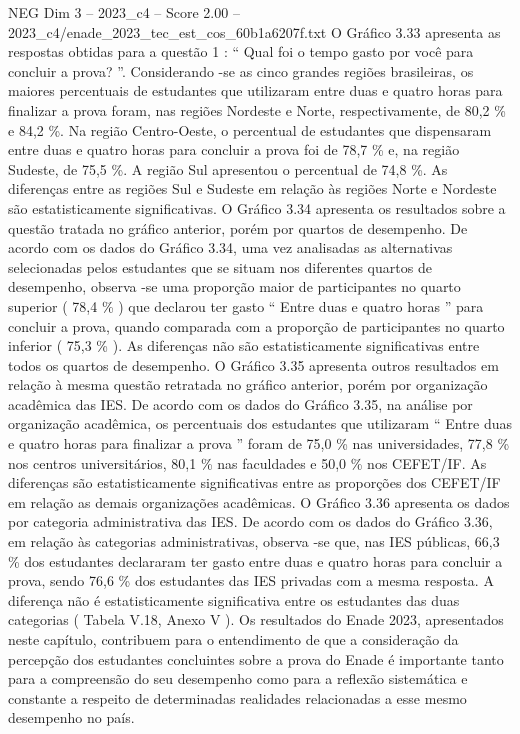 \begin{textsample}{NEG Dim 3 – 2023\_c4 – Score 2.00 – 2023\_c4/enade\_2023\_tec\_est\_cos\_60b1a6207f.txt}
O Gráfico 3.33 apresenta as respostas obtidas para a questão 1 : “ Qual foi o tempo gasto por você para concluir a prova? ”.
Considerando -se as cinco grandes regiões brasileiras, os maiores percentuais de estudantes que utilizaram entre duas e quatro horas para finalizar a prova foram, nas regiões Nordeste e Norte, respectivamente, de 80,2 \% e 84,2 \%.
Na região Centro-Oeste, o percentual de estudantes que dispensaram entre duas e quatro horas para concluir a prova foi de 78,7 \% e, na região Sudeste, de 75,5 \%.
A região Sul apresentou o percentual de 74,8 \%.
As diferenças entre as regiões Sul e Sudeste em relação às regiões Norte e Nordeste são estatisticamente significativas.
O Gráfico 3.34 apresenta os resultados sobre a questão tratada no gráfico anterior, porém por quartos de desempenho.
De acordo com os dados do Gráfico 3.34, uma vez analisadas as alternativas selecionadas pelos estudantes que se situam nos diferentes quartos de desempenho, observa -se uma proporção maior de participantes no quarto superior ( 78,4 \% ) que declarou ter gasto “ Entre duas e quatro horas ” para concluir a prova, quando comparada com a proporção de participantes no quarto inferior ( 75,3 \% ).
As diferenças não são estatisticamente significativas entre todos os quartos de desempenho.
O Gráfico 3.35 apresenta outros resultados em relação à mesma questão retratada no gráfico anterior, porém por organização acadêmica das IES.
De acordo com os dados do Gráfico 3.35, na análise por organização acadêmica, os percentuais dos estudantes que utilizaram “ Entre duas e quatro horas para finalizar a prova ” foram de 75,0 \% nas universidades, 77,8 \% nos centros universitários, 80,1 \% nas faculdades e 50,0 \% nos CEFET/IF.
As diferenças são estatisticamente significativas entre as proporções dos CEFET/IF em relação as demais organizações acadêmicas.
O Gráfico 3.36 apresenta os dados por categoria administrativa das IES.
De acordo com os dados do Gráfico 3.36, em relação às categorias administrativas, observa -se que, nas IES públicas, 66,3 \% dos estudantes declararam ter gasto entre duas e quatro horas para concluir a prova, sendo 76,6 \% dos estudantes das IES privadas com a mesma resposta.
A diferença não é estatisticamente significativa entre os estudantes das duas categorias ( Tabela V.18, Anexo V ).
Os resultados do Enade 2023, apresentados neste capítulo, contribuem para o entendimento de que a consideração da percepção dos estudantes concluintes sobre a prova do Enade é importante tanto para a compreensão do seu desempenho como para a reflexão sistemática e constante a respeito de determinadas realidades relacionadas a esse mesmo desempenho no país.

\end{textsample}
